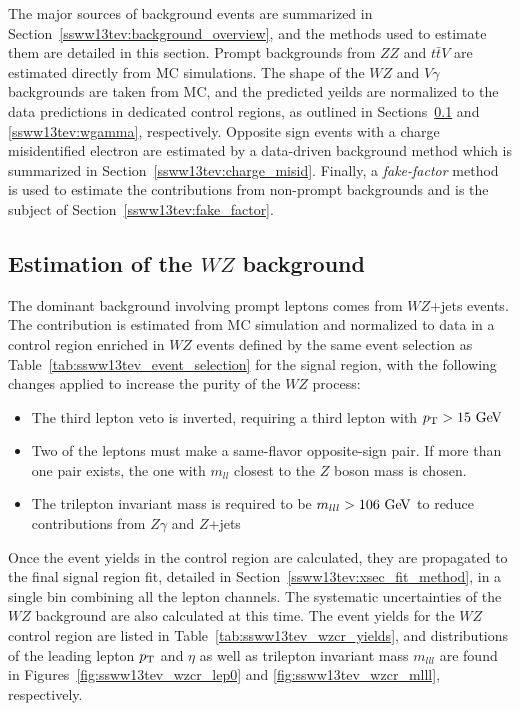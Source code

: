 The major sources of background events are summarized in Section~\ref{ssww13tev:background_overview}, and the methods used to estimate them are detailed in this section.  
Prompt backgrounds from $ZZ$ and $t\bar{t}V$ are estimated directly from MC simulations.
The shape of the $WZ$ and $V\gamma$ backgrounds are taken from MC, and the predicted yeilds are normalized to the data predictions in dedicated control regions, as outlined in Sections~\ref{ssww13tev:wz} and \ref{ssww13tev:wgamma}, respectively.
Opposite sign events with a charge misidentified electron are estimated by a data-driven background method which is summarized in Section~\ref{ssww13tev:charge_misid}.
Finally, a \emph{fake-factor} method is used to estimate the contributions from non-prompt backgrounds and is the subject of Section~\ref{ssww13tev:fake_factor}.

\subsection{Estimation of the $WZ$ background}\label{ssww13tev:wz}
The dominant background involving prompt leptons comes from $WZ$+jets events.
The contribution is estimated from MC simulation and normalized to data in a control region enriched in $WZ$ events defined by the same event selection as Table~\ref{tab:ssww13tev_event_selection} for the signal region, with the following changes applied to increase the purity of the $WZ$ process:
\begin{itemize}
\item The third lepton veto is inverted, requiring a third lepton with $\pt > 15\gev$
\item Two of the leptons must make a same-flavor opposite-sign pair. If more than one pair exists, the one with $m_{ll}$ closest to the $Z$ boson mass is chosen.
\item The trilepton invariant mass is required to be $m_{lll} > 106\gev$ to reduce contributions from $Z\gamma$ and $Z$+jets
\end{itemize}

Once the event yields in the control region are calculated, they are propagated to the final signal region fit, detailed in Section~\ref{ssww13tev:xsec_fit_method}, in a single bin combining all the lepton channels.
The systematic uncertainties of the $WZ$ background are also calculated at this time.
The event yields for the $WZ$ control region are listed in Table~\ref{tab:ssww13tev_wzcr_yields}, and distributions of the leading lepton $p_{\mathrm{T}}$ and $\eta$ as well as trilepton invariant mass $m_{lll}$ are found in Figures~\ref{fig:ssww13tev_wzcr_lep0} and \ref{fig:ssww13tev_wzcr_mlll}, respectively.

